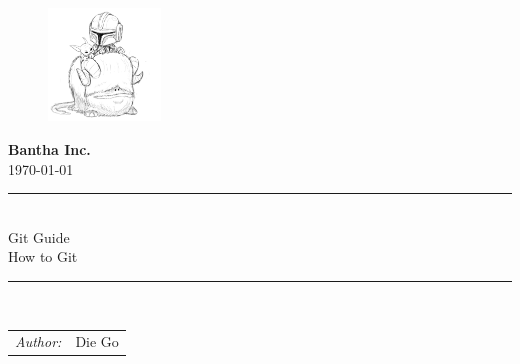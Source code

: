\documentclass[12pt]{article} %
\newcommand{\projectTitle}{Git Guide}
\newcommand{\reportTitle}{How to Git}
\begin{document}


\clearpage
{}
\setcounter{page}{1}

\begin{figure}
	\centering
	\includegraphics[width=3cm]{Fun_pics/bantha_inc.jpg}
\end{figure}

\begin{center}
	\textbf{\LARGE Bantha Inc.} \\
	\vspace{1cm}
	\Large \today \\
	\vspace{0.3cm}

	\rule{\linewidth}{0.5pt} \\
	\vspace{0.2cm}
\LARGE \projectTitle \\ \vspace{0.3cm} \large \reportTitle\\


	\vspace{0.1cm}
	\rule{\linewidth}{0.5pt} \\

	\vspace{1.5cm}

	\begin{tabular}{lr}
		\textit{Author:} & Die Go \\
	\end{tabular}

	\vspace{1cm}
	\date{}
\end{center}


\newpage
\end{document}
